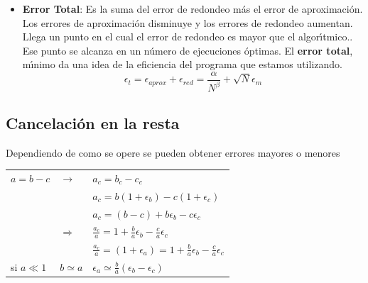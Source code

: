 \documentclass[spanish,titlepage,11pt]{article}
\begin{document}
\begin{itemize}
\item \textbf{Error Total}: Es la suma del error de redondeo m\'{a}s el error
de aproximaci\'{o}n. Los errores de aproximaci\'{o}n disminuye y los errores
de redondeo aumentan. Llega un punto en el cual el error de redondeo es mayor
que el algor\'{\i}tmico.. Ese punto se alcanza en un n\'{u}mero de ejecuciones
\'{o}ptimas. El \textbf{error total}, m\'{\i}nimo da una idea de la eficiencia
del programa que estamos utilizando.
\begin{equation}
\epsilon_{t}=\epsilon_{aprox}+\epsilon_{red}=\frac{\alpha}{N^{\beta}}+\sqrt
{N}\epsilon_{m}%
\end{equation}
\end{itemize}

\subsection{Cancelaci\'{o}n en la resta}

Dependiendo de como se opere se pueden obtener errores mayores o menores

\begin{center}%
\begin{tabular}
[c]{lll}%
$a=b-c$ & $\longrightarrow$ & $a_{c}=b_{c}-c_{c}$\\
&  & $a_{c}=b\left(  1+\epsilon_{b}\right)  -c\left(  1+\epsilon_{c}\right)
$\\
&  & $a_{c}=\left(  b-c\right)  +b\epsilon_{b}-c\epsilon_{c}$\\
& $\Longrightarrow$ & $\frac{a_{c}}{a}=1+\frac{b}{a}\epsilon_{b}-\frac{c}%
{a}\epsilon_{c}$\\
&  & $\frac{a_{c}}{a}=\left(  1+\epsilon_{a}\right)  =1+\frac{b}{a}%
\epsilon_{b}-\frac{c}{a}\epsilon_{c}$\\
si $a\ll1$ & $b\simeq a$ & $\epsilon_{a}\simeq\frac{b}{a}\left(  \epsilon
_{b}-\epsilon_{c}\right)  $%
\end{tabular}
\end{center}
\end{document}
